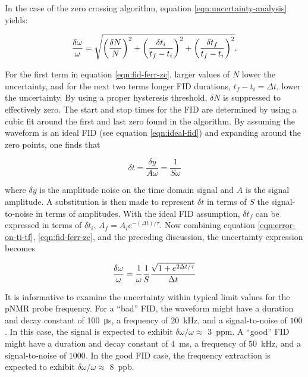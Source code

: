 \noindent
In the case of the zero crossing algorithm, equation \ref{eqn:uncertainty-analysis} yields:

\begin{equation}
\label{eqn:fid-ferr-zc}
\frac{\delta \omega}{\omega} = \\
\sqrt{
    \left( \frac{\delta N}{N} \right)^2 +
    \left( \frac{\delta t_i}{t_f - t_i} \right)^2 + 
    \left( \frac{\delta t_f}{t_f - t_i} \right)^2
    }.
\end{equation}

\noindent
For the first term in equation \ref{eqn:fid-ferr-zc}, larger values of $N$ lower the uncertainty, and for the next two terms longer FID durations, $t_f - t_i = \Delta t$, lower the uncertainty.  By using a proper hysteresis threshold, $\delta N$ is suppressed to effectively zero. The start and stop times for the FID are determined by using a cubic fit around the first and last zero found in the algorithm.  By assuming the waveform is an ideal FID (see equation \ref{eqn:ideal-fid}) and expanding around the zero points, one finds that 

\begin{equation}
\label{eqn:error-on-ti-tf}
\delta t = \frac{\delta y}{A \omega} = \frac{1}{S \omega}
\end{equation}

\noindent
where $\delta y$ is the amplitude noise on the time domain signal and $A$ is the signal amplitude.  A substitution is then made to represent $\delta t$ in terms of $S$ the signal-to-noise in terms of amplitudes.  With the ideal FID assumption, $\delta t_f$ can be expressed in terms of $\delta t_i$, $A_f = A_i e^{-(\Delta t) / \tau}$. Now combining equation \ref{eqn:error-on-ti-tf}, \ref{eqn:fid-ferr-zc}, and the preceding discussion, the uncertainty expression becomes

\begin{equation}
\label{eqn:fid-ferr-zc-2}
\frac{\delta \omega}{\omega} = \\
\frac{1}{\omega}\frac{1}{S}
\frac{\sqrt{1 + e^{2 \Delta t / \tau}}}{\Delta t}
\end{equation}

It is informative to examine the uncertainty within typical limit values for the pNMR probe frequency.  For a ``bad'' FID, the waveform might have a duration and decay constant of \SI{100}{\micro \second}, a frequency of \SI{20}{\kHz}, and a signal-to-noise of $100$.  In this case, the signal is expected to exhibit $\delta \omega / \omega \approx$ \SI{3}{ppm}.  A ``good'' FID might have a duration and decay constant of \SI{4}{\milli \second}, a frequency of \SI{50}{\kHz}, and a signal-to-noise of $1000$. In the good FID case, the frequency extraction is expected to exhibit $\delta \omega / \omega \approx$ \SI{8}{ppb}.

